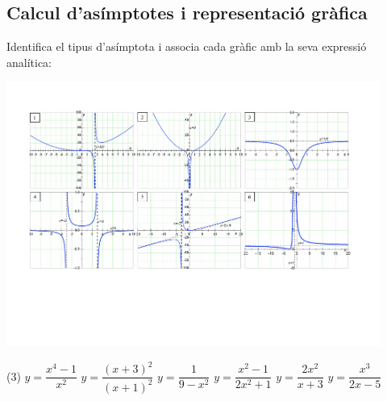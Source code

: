 \subsection{Calcul d'asímptotes i representació gràfica}

\begin{mylist}
\exer Identifica el tipus d'asímptota i associa cada gràfic amb la seva expressió analítica:

\noindent \includegraphics[width=0.92\textwidth]{img-06/misc-asimptotes.pdf} 	

\begin{center}
	\begin{tasks}(3)
		\task $y=\dfrac{x^4-1}{x^2}$
		\task $y=\dfrac{(x+3)^2}{(x+1)^2}$
		\task $y=\dfrac{1}{9-x^2}$
		\task $y=\dfrac{x^2-1}{2x^2+1}$
		\task $y=\dfrac{2x^2}{x+3}$
		\task $y=\dfrac{x^3}{2x-5}$	
	\end{tasks}
\end{center}

 

\end{mylist}
